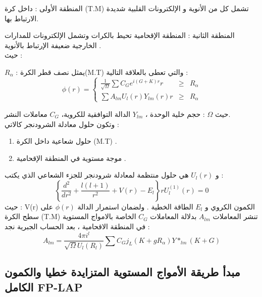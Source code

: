 المنطقة الأولى : داخل كرة (T.M) تشمل كل من الأنوية و الإلكترونات القلبية شديدة الارتباط بها.

المنطقة الثانية : المنطقة الإقحامية تحيط بالكرات وتشمل الإلكترونات للمدارات الخارجية ضعيفة الإرتباط  بالأنوية .\\
حيث :

$ R_{\alpha} $ : 	يمثل نصف قطر الكرة(M.T) والتي تعطى بالعلاقة التالية :		
\begin{equation}\label{}
	\phi (r) = \left\{\begin{array}{rcl}
		\frac{1}{\sqrt{\Omega}} \sum C_{G} e^{i(G+K)r}r & \geqslant & R_{\alpha} \\
		\sum A_{lm} U_{l} (r) Y_{lm}(r) r & \geqslant & R_{\alpha}
	\end{array} \right.
\end{equation}

حيث $ \Omega $ : حجم خلية الوحدة ، $ Y_{lm} $ الدالة التوافقية للكروية، $ C_{G} $ معاملات النشر.\\
وتكون حلول معادلة الشرودنجر كالاتي :
\begin{enumerate}
	\item  حلول شعاعية داخل الكرة (M.T) . 
	\item موجة مستوية في المنطقة الإقحامية .
\end{enumerate}
و  $ U_{l} (r) $ هي حلول منتظمة لمعادلة شرودنجر للجزء الشعاعي الذي يكتب  :		
\begin{equation}\label{}
	\left\{\frac{d^{2}}{dr^{2}} + \dfrac{l(l+1)}{r^{2}} + V(r) - E_{l} \right\} r U_{l}^{(1)} (r) = 0 
\end{equation}
حيث : V(r) الكمون الكروي و $  E_{l} $  الطاقة الخطية .
ولضمان استمرار الدالة $ \phi (r) $ على سطح الكرة (T.M) تنشر المعاملات $ A_{lm} $ بدلالة المعاملات $ C_{G} $ الخاصة بالامواج المستوية في  المنطقة الاقحامية ، بعد الحساب الجبرية نجد :
\begin{equation}\label{}
	A_{lm} = \dfrac{4\pi i^{l}}{\sqrt{\Omega} U_{l} (R_{l})} \sum C_{G} j_{L} ( K + g  R_{\alpha}) Y*_{lm} (K+G)
\end{equation}


\subsection{ مبدأ طريقة الأمواج المستوية المتزايدة خطيا والكمون الكامل FP-LAP }

